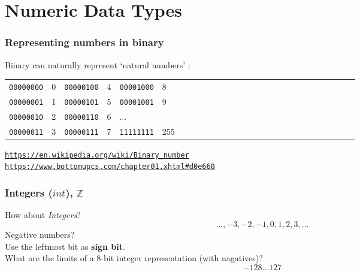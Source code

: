 \documentclass[11pt]{beamer}
\begin{document}
\section{Numeric Data Types}

\begin{frame}
  \frametitle{Representing numbers in binary}
  \Enlarge

  \begin{itemize}
  \myitem  Binary can naturally represent `natural numbers' :
    \begin{tabular}{*{27}{l}}
      \texttt{00000000} & 0 & \texttt{00000100} & 4 & \texttt{00001000} & 8\\
      \texttt{00000001} & 1 & \texttt{00000101} & 5 & \texttt{00001001} & 9\\
      \texttt{00000010} & 2 & \texttt{00000110} & 6 & ... & \\
      \texttt{00000011} & 3 & \texttt{00000111} & 7 & \texttt{11111111} & 255\\
    \end{tabular}
  \end{itemize} \pause
  
  \begin{center}
  \textcolor{blue}{\small \texttt{\url{https://en.wikipedia.org/wiki/Binary_number}}} \\
  \textcolor{blue}{\small \texttt{\url{https://www.bottomupcs.com/chapter01.xhtml\#d0e660}}} 
  \end{center}
\end{frame}

\begin{frame}
  \frametitle{Integers ($int$), $\mathbb{Z}$}
  \Enlarge

  \begin{itemize}
  \myitem  How about \emph{Integers}? \\
  $$ ..., -3, -2, -1, 0, 1, 2, 3, ... $$
  \myitem Negative numbers?  \\ \pause
  \myitem Use the leftmost bit as \textbf{sign bit}. \\ \pause
  \myitem What are the limits of a 8-bit integer representation (with nagatives)?\\ \pause
    $$ -128 ... 127 $$
  \end{itemize}
\end{frame}
\end{document}
